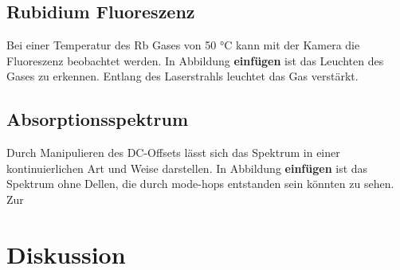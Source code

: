 \subsection{Rubidium Fluoreszenz}
Bei einer Temperatur des Rb Gases von 50 °C kann mit der Kamera die Fluoreszenz beobachtet werden.
In Abbildung \textbf{einfügen} ist das Leuchten des Gases zu erkennen.
Entlang des Laserstrahls leuchtet das Gas verstärkt.


\subsection{Absorptionsspektrum}
Durch Manipulieren des DC-Offsets lässt sich das Spektrum in einer kontinuierlichen Art und Weise darstellen. %
In Abbildung \textbf{einfügen} ist das Spektrum ohne Dellen, die durch mode-hops entstanden sein könnten zu sehen.
Zur 


\section{Diskussion}


\newpage
\printbibliography


